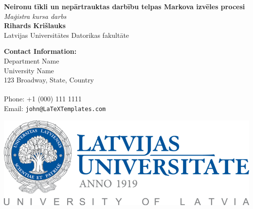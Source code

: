 \documentclass[a0,landscape]{a0poster}
\numberwithin{equation}{section}
\theoremstyle{definition}
\theoremstyle{plain}
\begin{document}


\begin{minipage}[b]{0.55\linewidth}
\veryHuge \color{NavyBlue} \textbf{Neironu tīkli un nepārtrauktas darbību telpas Markova izvēles procesi} \color{Black}\\ %
\Huge\textit{Maģistra kursa darbs}\\[1cm] %
\huge \textbf{Rihards Krišlauks}\\ %
\huge Latvijas Universitātes Datorikas fakultāte\\ %
\end{minipage}
%
\begin{minipage}[b]{0.25\linewidth}
\color{DarkSlateGray}\Large \textbf{Contact Information:}\\
Department Name\\ %
University Name\\
123 Broadway, State, Country\\\\
Phone: +1 (000) 111 1111\\ %
Email: \texttt{john@LaTeXTemplates.com}\\ %
\end{minipage}
%
\begin{minipage}[b]{0.19\linewidth}
\includegraphics[width=20cm]{lu-logo-full.png} %
\end{minipage}
\end{document}
